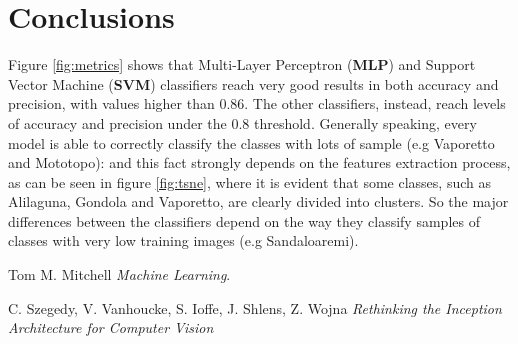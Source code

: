 \documentclass[12pt]{article}
\begin{document}
\section{Conclusions}
Figure \ref{fig:metrics} shows that Multi-Layer Perceptron (\textbf{MLP}) and Support Vector Machine (\textbf{SVM}) classifiers reach very good results in both accuracy and precision, with values higher than 0.86. The other classifiers, instead, reach levels of accuracy and precision under the 0.8 threshold. Generally speaking, every model is able to correctly classify the classes with lots of sample (e.g Vaporetto and Mototopo):  and this fact strongly depends on the features extraction process, as can be seen in figure \ref{fig:tsne}, where it is evident that some classes, such as Alilaguna, Gondola and Vaporetto, are clearly divided into clusters. So the major differences between the classifiers depend on the way they classify samples of classes with very low training images (e.g Sandaloaremi).
\newpage
\begin{thebibliography}{10}
	
	Tom M. Mitchell \textsl{Machine Learning}.
	
	C. Szegedy, V. Vanhoucke, S. Ioffe, J. Shlens, Z. Wojna
	\textsl{Rethinking the Inception Architecture for Computer Vision}
	
\end{thebibliography}
\end{document}
